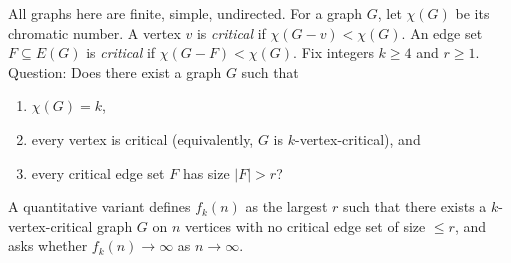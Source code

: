 All graphs here are finite, simple, undirected.
For a graph $G$, let $\chi(G)$ be its chromatic number.
A vertex $v$ is \emph{critical} if $\chi(G-v)<\chi(G)$.
An edge set $F\subseteq E(G)$ is \emph{critical} if $\chi(G-F)<\chi(G)$.
Fix integers $k\ge 4$ and $r\ge 1$.
Question: Does there exist a graph $G$ such that
\begin{enumerate}
\item $\chi(G)=k$,
\item every vertex is critical (equivalently, $G$ is $k$-vertex-critical), and
\item every critical edge set $F$ has size $|F|>r$?
\end{enumerate}
A quantitative variant defines $f_k(n)$ as the largest $r$ such that there exists a $k$-vertex-critical graph $G$ on $n$ vertices with no critical edge set of size $\le r$, and asks whether $f_k(n)\to\infty$ as $n\to\infty$.
